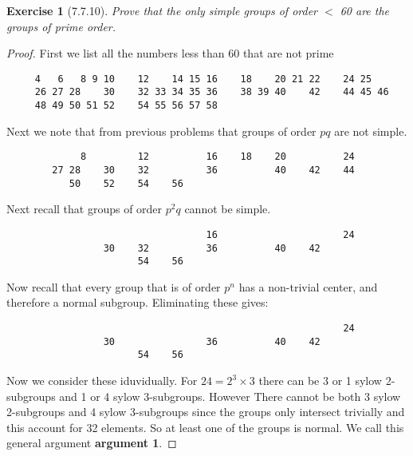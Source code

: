 \documentclass[12pt]{article}
\newtheorem*{exer}{Exercise}
\begin{document}

\begin{exer}[7.7.10]

    Prove that the only simple groups of order $<$ 60 are the groups of
    prime order.

\end{exer}

\begin{proof}

    First we list all the numbers less than 60 that are not prime 

    \begin{verbatim}
     4   6   8 9 10    12    14 15 16    18    20 21 22    24 25
     26 27 28    30    32 33 34 35 36    38 39 40    42    44 45 46
     48 49 50 51 52    54 55 56 57 58
     \end{verbatim}

     Next we note that from previous problems that groups of order $pq$
     are not simple.

     \begin{verbatim}
             8         12          16    18    20          24   
        27 28    30    32          36          40    42    44      
           50    52    54    56      
     \end{verbatim}

     Next recall that groups of order $p^2q$ cannot be simple.
        
     \begin{verbatim}
                                   16                      24   
                 30    32          36          40    42            
                       54    56      
     \end{verbatim}

     Now recall that every group that is of order $p^n$ has a
     non-trivial center, and therefore a normal subgroup. Eliminating
     these gives:

     \begin{verbatim}
                                                           24   
                 30                36          40    42            
                       54    56      
     \end{verbatim}

     Now we consider these iduvidually. For $24 = 2^3 \times 3$ there can be
     3 or 1 sylow 2-subgroups and 1 or 4 sylow 3-subgroups. However
     There cannot be both 3 sylow 2-subgroups and 4 sylow 3-subgroups
     since the groups only intersect trivially and this account for 32
     elements. So at least one of the groups is normal. We call this
     general argument \textbf{argument 1}. 


\end{proof}
\end{document}
